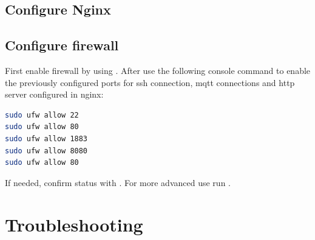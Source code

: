 \subsection{Configure Nginx}
\blindtext

\subsection{Configure firewall}
First enable firewall by using . After use the following console command to enable the previously configured ports for ssh connection, mqtt connections and http server configured in nginx:
\begin{lstlisting}[frame=none,language=bash,backgroundcolor=\color{gray!15},numbers=none,		basicstyle=\ttfamily]
sudo ufw allow 22
sudo ufw allow 80
sudo ufw allow 1883
sudo ufw allow 8080
sudo ufw allow 80
\end{lstlisting}
If needed, confirm status with . For more advanced use run .

\section{Troubleshooting}


